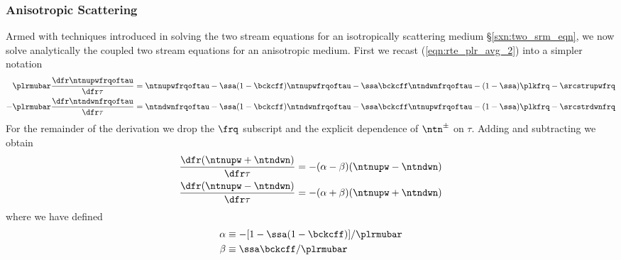 \documentclass[12pt]{article}
\begin{document}
\subsubsection[Anisotropic Scattering]{Anisotropic Scattering}\label{sxn:two_srm_asm_sct} 
Armed with techniques introduced in solving the two stream equations 
for an isotropically scattering medium \S\ref{sxn:two_srm_eqn},  
we now solve analytically the coupled two stream equations for
an anisotropic medium.
First we recast (\ref{eqn:rte_plr_avg_2}) into a simpler notation 
\begin{subequations}
\label{eqn:two_str_asm_apx}
\begin{align}
\label{eqn:two_str_asm_apx_upw}
\plrmubar \frac{\dfr\ntnupwfrqoftau}{\dfr\tau} & =  
\ntnupwfrqoftau - \ssa (1 - \bckcff) \ntnupwfrqoftau 
- \ssa \bckcff \ntndwnfrqoftau  - (1-\ssa) \plkfrq - \srcstrupwfrq \\
\label{eqn:two_str_asm_apx_dwn}
- \plrmubar \frac{\dfr\ntndwnfrqoftau}{\dfr\tau} & =  
\ntndwnfrqoftau - \ssa (1 - \bckcff) \ntndwnfrqoftau 
- \ssa \bckcff \ntnupwfrqoftau  - (1-\ssa) \plkfrq - \srcstrdwnfrq
\end{align}
\end{subequations} 
For the remainder of the derivation we drop the $\frq$
subscript and the explicit dependence of $\ntn^{\pm}$ on $\tau$.
Adding and subtracting we obtain
\begin{subequations}
\label{eqn:two_str_asm_abb}
\begin{align}
\label{eqn:two_str_asm_pls}
\frac{\dfr(\ntnupw + \ntndwn)}{\dfr\tau} & =  
-(\alpha - \beta) (\ntnupw - \ntndwn) \\
\label{eqn:two_str_asm_mns}
\frac{\dfr(\ntnupw - \ntndwn)}{\dfr\tau} & =  
-(\alpha + \beta) (\ntnupw + \ntndwn)
\end{align}
\end{subequations} 
where we have defined 
\begin{subequations}
\label{eqn:two_str_asm_abb}
\begin{align}
\label{eqn:two_str_asm_alpha}
\alpha & \equiv -[ 1 - \ssa ( 1 - \bckcff ) ] / \plrmubar \\
\label{eqn:two_str_asm_beta}
\beta & \equiv \ssa \bckcff / \plrmubar
\end{align}
\end{subequations} 
\end{document}
